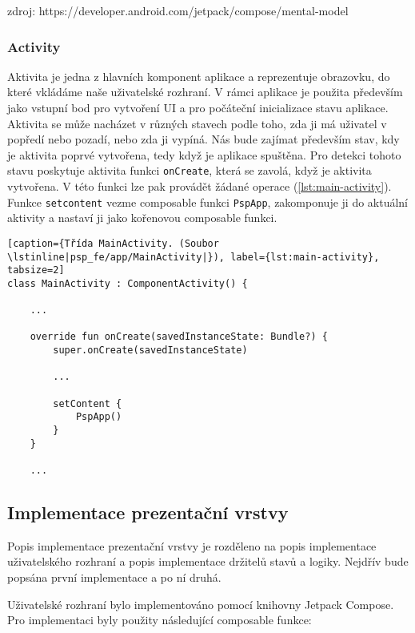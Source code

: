 \noindent zdroj:
https://developer.android.com/jetpack/compose/mental-model

\subsubsection*{Activity}
Aktivita je jedna z hlavních komponent aplikace a reprezentuje obrazovku, do které vkládáme naše uživatelské rozhraní. V rámci aplikace je použita především jako vstupní bod pro vytvoření UI a pro počáteční inicializace stavu aplikace. Aktivita se může nacházet v různých stavech podle toho, zda ji má uživatel v popředí nebo pozadí, nebo zda ji vypíná. Nás bude zajímat především stav, kdy je aktivita poprvé vytvořena, tedy když je aplikace spuštěna. Pro detekci tohoto stavu poskytuje aktivita funkci \lstinline|onCreate|, která se zavolá, když je aktivita vytvořena. V této funkci lze pak provádět žádané operace (\ref{lst:main-activity}). Funkce \lstinline|setcontent| vezme composable funkci \lstinline|PspApp|, zakomponuje ji do aktuální aktivity a nastaví ji jako kořenovou composable funkci.

\begin{lstlisting}[caption={Třída MainActivity. (Soubor \lstinline|psp_fe/app/MainActivity|}), label={lst:main-activity}, tabsize=2]
class MainActivity : ComponentActivity() {

	...
	
	override fun onCreate(savedInstanceState: Bundle?) {
		super.onCreate(savedInstanceState)
		
		...
		
		setContent {
			PspApp()
		}
	}

	...
\end{lstlisting}

\subsection {Implementace prezentační vrstvy}
\label{sssec:impl-ui}
Popis implementace prezentační vrstvy je rozděleno na popis implementace uživatelského rozhraní a popis implementace držitelů stavů a logiky. Nejdřív bude popsána první implementace a po ní druhá. 

Uživatelské rozhraní bylo implementováno pomocí knihovny Jetpack Compose. Pro implementaci byly použity následující composable funkce:

